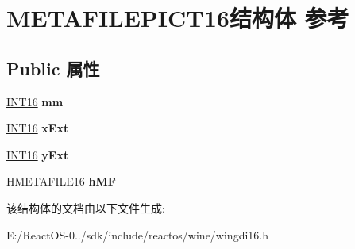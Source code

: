 \hypertarget{struct_m_e_t_a_f_i_l_e_p_i_c_t16}{}\section{M\+E\+T\+A\+F\+I\+L\+E\+P\+I\+C\+T16结构体 参考}
\label{struct_m_e_t_a_f_i_l_e_p_i_c_t16}
\subsection*{Public 属性}
\begin{DoxyCompactItemize}
\item 
\mbox{\label{struct_m_e_t_a_f_i_l_e_p_i_c_t16_a0c40393755b0afb560c980b54f8853f0}} 
\hyperlink{_processor_bind_8h_a30f500129d8c688af07726d5d34ce52d}{I\+N\+T16} {\bfseries mm}
\item 
\mbox{\label{struct_m_e_t_a_f_i_l_e_p_i_c_t16_a371740a8adc5f04da6bc28fd69c52e1e}} 
\hyperlink{_processor_bind_8h_a30f500129d8c688af07726d5d34ce52d}{I\+N\+T16} {\bfseries x\+Ext}
\item 
\mbox{\label{struct_m_e_t_a_f_i_l_e_p_i_c_t16_abcf94efb4e303ceea7f71d94182f67b6}} 
\hyperlink{_processor_bind_8h_a30f500129d8c688af07726d5d34ce52d}{I\+N\+T16} {\bfseries y\+Ext}
\item 
\mbox{\label{struct_m_e_t_a_f_i_l_e_p_i_c_t16_af342ec6c2c74d1b69be5bbefa9a9063c}} 
H\+M\+E\+T\+A\+F\+I\+L\+E16 {\bfseries h\+MF}
\end{DoxyCompactItemize}


该结构体的文档由以下文件生成\+:\begin{DoxyCompactItemize}
\item 
E\+:/\+React\+O\+S-\/0../sdk/include/reactos/wine/wingdi16.\+h\end{DoxyCompactItemize}
